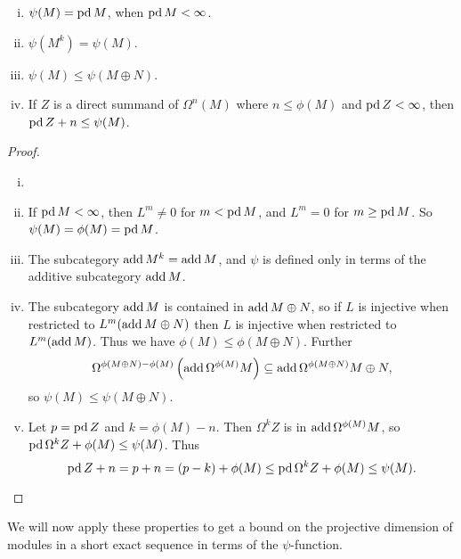\begin{lemma} \cite[Lemma~3]{IgTo05} \label{lem:properties_of_psi}
	\begin{enumerate}[i)]
		\item $\psi(M) = \operatorname{pd} M$, when $\operatorname{pd} M < \infty$.
		\item $\psi(M^k) = \psi(M)$.
		\item $\psi(M) \leq \psi(M\oplus N)$.
		\item If $Z$ is a direct summand of $\Omega^n(M)$ where $n \leq \phi(M)$ and $\operatorname{pd} Z < \infty$, then $\operatorname{pd} Z + n \leq \psi(M)$.
	\end{enumerate}
	\begin{proof}
		\begin{enumerate}[i)]
			\item[] %
			\item If $\operatorname{pd} M < \infty$, then $L^m \neq 0$ for $m < \operatorname{pd} M$, and $L^m =0$ for $m \geq \operatorname{pd} M$. So $\psi(M)=\phi(M)=\operatorname{pd} M$.
			\item The subcategory $\operatorname{add} M^k = \operatorname{add} M$, and $\psi$ is defined only in terms of the additive subcategory $\operatorname{add} M$.
			\item  The subcategory $\operatorname{add} M$ is contained in $\operatorname{add} M\oplus N$, so if $L$ is injective when restricted to $L^m(\operatorname{add} M\oplus N)$ then $L$ is injective when restricted to $L^m(\operatorname{add} M)$. Thus we have $\phi(M) \leq \phi({M\oplus N})$. Further $$\Omega^{\phi({M\oplus N})-\phi(M)}\left(\operatorname{add}\Omega^{\phi(M)}M \right) \subseteq \operatorname{add}\Omega^{\phi({M\oplus N})} M\oplus N,$$ 
			so $\psi(M) \leq \psi(M\oplus N)$.
			\item Let $p=\operatorname{pd} Z$ and $k = \phi(M) - n$. Then $\Omega^k Z$ is in $\operatorname{add} \Omega^{\phi(M)}M$, so $\operatorname{pd}\Omega^k Z + \phi(M) \leq \psi(M)$. Thus $$\operatorname{pd} Z + n = p + n = (p-k) + \phi(M) \leq \operatorname{pd}\Omega^k Z + \phi(M) \leq \psi(M).$$
		\end{enumerate}
	\end{proof}
\end{lemma}

We will now apply these properties to get a bound on the projective dimension of modules in a short exact sequence in terms of the $\psi$-function.


